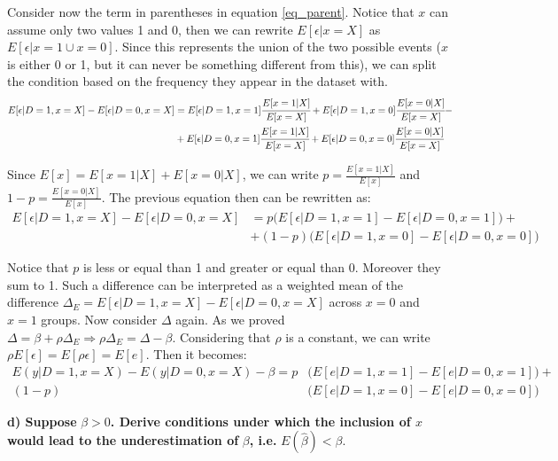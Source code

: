 \documentclass[a4paper,12pt,oneside,English]{article}
\begin{document}
Consider now the term in parentheses in equation \eqref{eq_parent}. Notice that $x$ can assume only two values 1 and 0, then we can rewrite $E[\epsilon|x=X]$ as $E[\epsilon|x=1\cup x=0]$. Since this represents the union of the two possible events ($x$ is either 0 or 1, but it can never be something different from this), we can split the condition based on the frequency they appear in the dataset with.
\begin{equation}
\begin{split}
    E[\epsilon|D=1, x=X]-E[\epsilon|D=0, x=X]&=E[\epsilon|D=1, x=1]\cfrac{E[x=1|X]}{E[x=X]}+E[\epsilon|D=1, x=0]\cfrac{E[x=0|X]}{E[x=X]}-\\&+E[\epsilon|D=0, x=1]\cfrac{E[x=1|X]}{E[x=X]}+E[\epsilon|D=0, x=0]\cfrac{E[x=0|X]}{E[x=X]}
\end{split}
\end{equation}

Since $E[x]=E[x=1|X]+E[x=0|X]$, we can write $p=\frac{E[x=1|X]}{E[x]}$ and $1-p=\frac{E[x=0|X]}{E[x]}$. The previous equation then can be rewritten as:
\begin{equation}
    \begin{split}
    E[\epsilon|D=1, x=X]-E[\epsilon|D=0, x=X]&=p\Biggl(E[\epsilon|D=1, x=1]-E[\epsilon|D=0, x=1]\Biggr)+\\&+(1-p)\Biggl(E[\epsilon|D=1, x=0]-E[\epsilon|D=0, x=0]\Biggr)
\end{split}
\end{equation}

Notice that $p$ is less or equal than 1 and greater or equal than 0. Moreover they sum to 1. Such a difference can be interpreted as a weighted mean of the difference $\Delta_E=E[\epsilon|D=1, x=X]-E[\epsilon|D=0, x=X]$ across $x=0$ and $x=1$ groups. Now consider $\Delta$ again. As we proved $\Delta=\beta+\rho\Delta_E\Rightarrow\rho\Delta_E=\Delta-\beta$. Considering that $\rho$ is a constant, we can write $\rho E[\epsilon]=E[\rho\epsilon]=E[e]$. Then it becomes:
\begin{equation}
\begin{split}
        E(y|D = 1,x = X) - E(y|D = 0,x = X)-\beta
=p&\Biggl(E[e|D=1, x=1]-E[e|D=0, x=1]\Biggr)+\\(1-p)&\Biggl(E[e|D=1, x=0]-E[e|D=0, x=0]\Biggr)
\end{split}
\end{equation}



\textbf{d) Suppose }$\beta > 0$\textbf{. Derive conditions under which the inclusion of $x$ would lead to the underestimation of} $\beta$\textbf{, i.e.} $E(\hat\beta) < \beta$.
\end{document}
